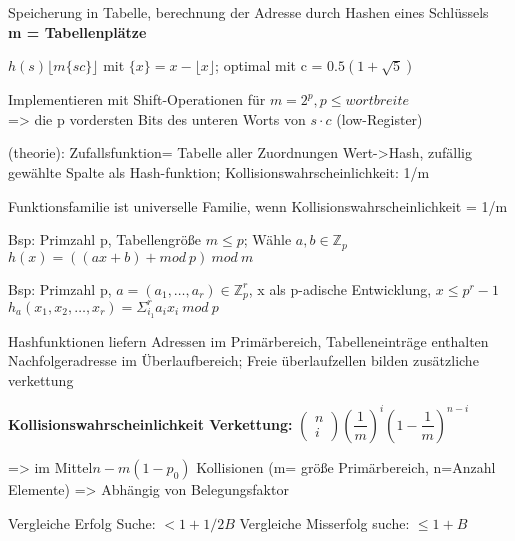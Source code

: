 Speicherung in Tabelle, berechnung der Adresse durch Hashen eines Schlüssels \\
\textbf{m = Tabellenplätze}


$h(s) \lfloor m \lbrace sc \rbrace \rfloor$ mit $ \lbrace x \rbrace  = x - \lfloor x \rfloor$;
optimal mit c = $0.5(1+\sqrt{5})$ 

Implementieren mit Shift-Operationen für $m = 2^p, p\leq wortbreite$\\
=> die p vordersten Bits des unteren Worts von $s\cdot c$ (low-Register)


(theorie): Zufallsfunktion= Tabelle aller Zuordnungen Wert->Hash, zufällig gewählte Spalte als Hash-funktion;
Kollisionswahrscheinlichkeit: 1/m

Funktionsfamilie ist universelle Familie, wenn Kollisionswahrscheinlichkeit = 1/m

Bsp: Primzahl p, Tabellengröße $m \leq p$; Wähle $a,b \in \mathbb{Z}_p$\\
$h(x) = ((ax+b)+mod~ p )~ mod~ m$

Bsp: Primzahl p, $a=(a_1,\dots,a_r) \in \mathbb{Z}_p^r$, x als p-adische Entwicklung, $x \leq p^r-1$\\
$h_a( x_1, x_2, \dots ,x_r ) = \Sigma_{i_1}^r a_i x_i ~mod ~p$

Hashfunktionen liefern Adressen im Primärbereich, Tabelleneinträge enthalten Nachfolgeradresse im Überlaufbereich; Freie überlaufzellen bilden zusätzliche verkettung

\textbf{Kollisionswahrscheinlichkeit Verkettung:} $\left( \begin{array}{c}n \\ i\end{array} \right) \left( \dfrac{1}{m} \right)^i \left( 1- \dfrac{1}{m} \right)^{n-i} $

=> im Mittel$n-m(1-p_0)$ Kollisionen (m= größe Primärbereich, n=Anzahl Elemente) => Abhängig von Belegungsfaktor

Vergleiche Erfolg Suche: $<1+1/2B$ Vergleiche Misserfolg suche: $\leq 1+ B$

